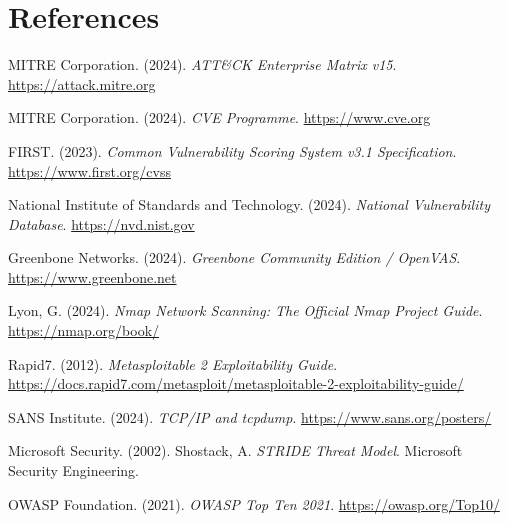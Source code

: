 \documentclass[11pt,a4paper]{article}
\begin{document}
\section*{References}

\begin{enumerate}[label={[\arabic*]}, leftmargin=*, nosep]
  \item MITRE Corporation. (2024). \textit{ATT\&CK Enterprise Matrix v15}. \url{https://attack.mitre.org}
  \item MITRE Corporation. (2024). \textit{CVE Programme}. \url{https://www.cve.org}
  \item FIRST. (2023). \textit{Common Vulnerability Scoring System v3.1 Specification}. \url{https://www.first.org/cvss}
  \item National Institute of Standards and Technology. (2024). \textit{National Vulnerability Database}. \url{https://nvd.nist.gov}
  \item Greenbone Networks. (2024). \textit{Greenbone Community Edition / OpenVAS}. \url{https://www.greenbone.net}
  \item Lyon, G. (2024). \textit{Nmap Network Scanning: The Official Nmap Project Guide}. \url{https://nmap.org/book/}
  \item Rapid7. (2012). \textit{Metasploitable 2 Exploitability Guide}. \url{https://docs.rapid7.com/metasploit/metasploitable-2-exploitability-guide/}
  \item SANS Institute. (2024). \textit{TCP/IP and tcpdump}. \url{https://www.sans.org/posters/}
  \item Microsoft Security. (2002). Shostack, A. \textit{STRIDE Threat Model}. Microsoft Security Engineering.
  \item OWASP Foundation. (2021). \textit{OWASP Top Ten 2021}. \url{https://owasp.org/Top10/}
\end{enumerate}
\end{document}
